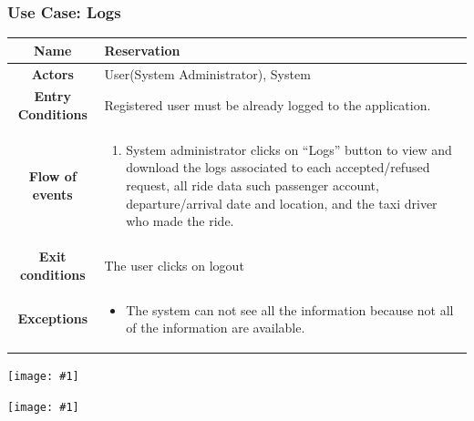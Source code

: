 \documentclass[11pt, a4paper,titlepage]{article}
\newcommand{\image}[1]{
	\begin{center}
		\noindent \texttt{[image: \#1]}
	\end{center}
	}
\begin{document}
\subsubsection{Use Case: Logs}
		\begin{tabularx}{\textwidth}{| c | X |}
			\hline
			\textbf{Name} & 
			Reservation
			\\
			\hline
			\textbf{Actors} & 
			User(System Administrator), System 
			\\
			\hline
			\textbf{Entry Conditions} &
			Registered user must be already logged to the application. 
			\\
			\hline
			\textbf{Flow of events} & 
			\begin{enumerate}
				\item System administrator clicks on “Logs” button to view and download the logs associated to each accepted/refused request, all ride data such passenger account, departure/arrival date and location, and the taxi driver who made the ride.
			\end{enumerate}						
			\\
			\hline
			\textbf{Exit conditions} & 
			The user clicks on logout
			\\
			\hline
			\textbf{Exceptions} & 
			\begin{itemize}
				\item The system can not see all the information because not all of the information are available.
			\end{itemize} 
			\\
			\hline		
		\end{tabularx}
		\image{usecase_logs.png}
		\image{diagram_sequence_logs.png}
		\newpage
\end{document}
